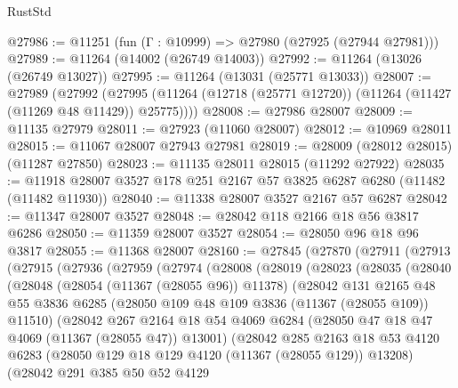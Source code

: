 \begin{lexlean}{RustStd}
\begin{coremodule}
@27986 := @11251 (fun (Γ : @10999) => @27980 (@27925 (@27944 @27981)))
@27989 := @11264 (@14002 (@26749 @14003))
@27992 := @11264 (@13026 (@26749 @13027))
@27995 := @11264 (@13031 (@25771 @13033))
@28007 := @27989
    (@27992 (@27995 (@11264 (@12718 (@25771 @12720)) (@11264 (@11427 (@11269 @48 @11429)) @25775))))
@28008 := @27986 @28007
@28009 := @11135 @27979
@28011 := @27923 (@11060 @28007)
@28012 := @10969 @28011
@28015 := @11067 @28007 @27943 @27981
@28019 := @28009 (@28012 @28015) (@11287 @27850)
@28023 := @11135 @28011 @28015 (@11292 @27922)
@28035 := @11918 @28007 @3527 @178 @251 @2167 @57 @3825 @6287 @6280 (@11482 (@11482 @11930))
@28040 := @11338 @28007 @3527 @2167 @57 @6287
@28042 := @11347 @28007 @3527
@28048 := @28042 @118 @2166 @18 @56 @3817 @6286
@28050 := @11359 @28007 @3527
@28054 := @28050 @96 @18 @96 @3817
@28055 := @11368 @28007
@28160 := @27845
    (@27870
      (@27911
        (@27913
          (@27915
            (@27936
              (@27959
                (@27974
                  (@28008
                    (@28019
                      (@28023
                        (@28035
                          (@28040
                            (@28048
                              (@28054 (@11367 (@28055 @96)) @11378)
                              (@28042
                                @131
                                @2165
                                @48
                                @55
                                @3836
                                @6285
                                (@28050 @109 @48 @109 @3836 (@11367 (@28055 @109)) @11510)
                                (@28042
                                  @267
                                  @2164
                                  @18
                                  @54
                                  @4069
                                  @6284
                                  (@28050 @47 @18 @47 @4069 (@11367 (@28055 @47)) @13001)
                                  (@28042
                                    @285
                                    @2163
                                    @18
                                    @53
                                    @4120
                                    @6283
                                    (@28050 @129 @18 @129 @4120 (@11367 (@28055 @129)) @13208)
                                    (@28042
                                      @291
                                      @385
                                      @50
                                      @52
                                      @4129

\end{coremodule}
\end{lexlean}
